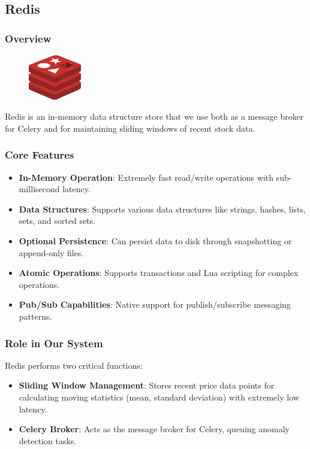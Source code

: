 \subsection{Redis}

\subsubsection{Overview}


\begin{figure}  %
    \vspace{-10pt} %
    \includegraphics[width=2.3cm]{figures/redis.png}
    \vspace{-10pt}
\end{figure}



Redis is an in-memory data structure store that we use both as a message broker for Celery and for maintaining sliding windows of recent stock data.

\subsubsection{Core Features}
\begin{itemize}
    \item \textbf{In-Memory Operation}: Extremely fast read/write operations with sub-millisecond latency.
    \item \textbf{Data Structures}: Supports various data structures like strings, hashes, lists, sets, and sorted sets.
    \item \textbf{Optional Persistence}: Can persist data to disk through snapshotting or append-only files.
    \item \textbf{Atomic Operations}: Supports transactions and Lua scripting for complex operations.
    \item \textbf{Pub/Sub Capabilities}: Native support for publish/subscribe messaging patterns.
\end{itemize}

\subsubsection{Role in Our System}
Redis performs two critical functions:
\begin{itemize}
    \item \textbf{Sliding Window Management}: Stores recent price data points for calculating moving statistics (mean, standard deviation) with extremely low latency.
    \item \textbf{Celery Broker}: Acts as the message broker for Celery, queuing anomaly detection tasks.
\end{itemize}


